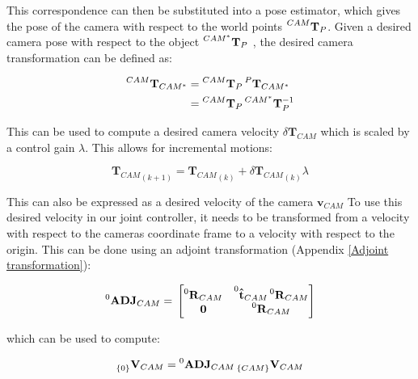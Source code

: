 \documentclass{UoNMCHA}
\numberwithin{equation}{section}
\begin{document}
This correspondence can then be substituted into a pose estimator, which gives the pose of the camera with respect to the world points $\prescript{CAM}{}{\mathbf{T}}_{P}$. Given a desired camera pose with respect to the object $\prescript{CAM^{*}}{}{\mathbf{T}}_{P}$ , the desired camera transformation can be defined as:

\begin{equation}
	\begin{aligned}
	\prescript{CAM}{}{\mathbf{T}}_{CAM^{*}} & =
	\prescript{CAM}{}{\mathbf{T}}_{P}  \prescript{P}{}{\mathbf{T}}_{CAM^{*}}\\
	 & = \prescript{CAM}{}{\mathbf{T}}_{P}  \prescript{CAM^{*}}{}{\mathbf{T}}_{P}^{-1}
	\end{aligned}	
\end{equation}


This can be used to compute a desired camera velocity $\delta \mathbf{T}_{CAM}$ which is scaled by a control gain $\lambda$. This allows for incremental motions:

\begin{equation}
	{\mathbf{T}_{CAM}}_{(k+1)} = {\mathbf{T}_{CAM}}_{(k)} + {\delta \mathbf{T}_{CAM}}_{(k)} \lambda
\end{equation}

This can also be expressed as a desired velocity of the camera $\mathbf{v}_{CAM}$
To use this desired velocity in our joint controller, it needs to be transformed from a velocity with respect to the cameras coordinate frame to a velocity with respect to the origin. This can be done using an adjoint transformation (Appendix \ref{Adjoint transformation}):

\begin{equation}
	\prescript{0}{}{\mathbf{ADJ}}_{CAM} = \\
	\begin{bmatrix}
		\prescript{0}{}{\mathbf{R}}_{CAM} & \prescript{0}{}{\mathbf{\hat{t}}}_{CAM}\prescript{0}{}{\mathbf{R}}_{CAM} \\
		\mathbf{0} & \prescript{0}{}{\mathbf{R}}_{CAM} 
	\end{bmatrix}
\end{equation}


which can be used to compute:

\begin{equation}
	\prescript{}{\{0\}}{\mathbf{V}}_{CAM} =
	\prescript{0}{}{\mathbf{ADJ}}_{CAM} \prescript{}{\{CAM\}}{\mathbf{V}}_{CAM}
\end{equation}
\end{document}
